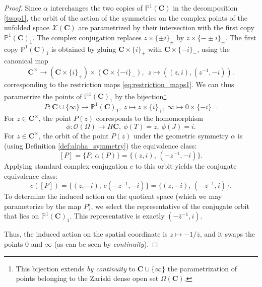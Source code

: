 \documentclass[10pt,a4paper]{amsart}
\newcommand{\C}{\mathbf{C}}
\renewcommand{\P}{\mathbb{P}}
\begin{document}
\begin{proof}
 Since $\alpha$ interchanges the two copies of $\P^1(\C)$ in   the decomposition \eqref{twop1}, the orbit of the action of the symmetries on the complex points of the unfolded space $\mathcal X(\C)$ are parametrized by their intersection with the first copy $\P^1(\C)_1$. 
The complex conjugation replaces $z\times \{\pm i\}_\pm$ by $\bar z\times \{-\pm i\}_\pm$. The first copy $\P^1(\C)_1$ is obtained by gluing
$
\C\times\{i\}_+$
with
$\C\times\{-i\}_-$, using the canonical map
\[
\C^\times \to \left(\C\times\{i\}_+\right)\times \left(\C\times\{-i\}_-\right), \  \ z\mapsto ((z,i),(z^{-1},-i)).
\]
corresponding to the restriction maps \eqref{eq:restriction_maps1}. We can thus parametrize the points of $\P^1(\C)_1$ by the bijection\footnote{This bijection extends \emph{by continuity} to $\C\cup\{\infty\}$ the parametrization of points belonging to the Zariski dense open set $\Omega(\C)$.}
\[
P:\C\cup \{\infty\}\to \P^1(\C)_1, \  z\mapsto z\times \{ i\}_+, \ \infty  \mapsto 0 \times  \{ -i\}_-.
\]
For $z\in \C^\times$, the point $P(z)$ corresponds to the homomorphism 
\[
\phi: \mathcal O(\Omega)\to H\C, \ \phi(T)=z, \ \phi(J)=i.
\]
For $z\in \C^\times$, the orbit of the point $P(z)$ under the geometric symmetry $\alpha$ is (using Definition \ref{def:alpha_symmetry}) the equivalence class:
\[
[P] = \big\{ P, \, \alpha(P) \big\} = \big\{ (z, i), \, (-z^{-1}, -i) \big\}.
\]
Applying standard complex conjugation $c$ to this orbit yields the conjugate equivalence class:
\[
c([P]) = \big\{ (\bar{z}, -i), \, c(-z^{-1}, -i) \big\} = \big\{ (\bar{z}, -i), \, (-\bar{z}^{-1}, i) \big\}.
\]
To determine the induced action on the quotient space (which we may parameterize by the map $P$), we select the representative of the conjugate orbit that lies on $\P^1(\C)_1$. This representative is exactly $(-\bar{z}^{-1}, i)$. 

Thus, the induced action on the spatial coordinate is $z \mapsto -1/\bar{z}$, and it swaps the points $0$ and $\infty$ (as can be seen by \emph{continuity}).
\end{proof}
\end{document}
